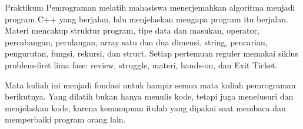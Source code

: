\documentclass[a4paper]{article}
\begin{document}
\par\vspace{4pt}\par\vspace{6pt}
\newpage
{}
Praktikum Pemrograman melatih mahasiswa menerjemahkan algoritma menjadi program C++ yang berjalan, lalu menjelaskan mengapa program itu berjalan. Materi mencakup struktur program, tipe data dan masukan, operator, percabangan, perulangan, array satu dan dua dimensi, string, pencarian, pengurutan, fungsi, rekursi, dan struct. Setiap pertemuan reguler memakai siklus problem-first lima fase: review, struggle, materi, hands-on, dan Exit Ticket.

Mata kuliah ini menjadi fondasi untuk hampir semua mata kuliah pemrograman berikutnya. Yang dilatih bukan hanya menulis kode, tetapi juga menelusuri dan menjelaskan kode, karena kemampuan itulah yang dipakai saat membaca dan memperbaiki program orang lain.
\end{document}
